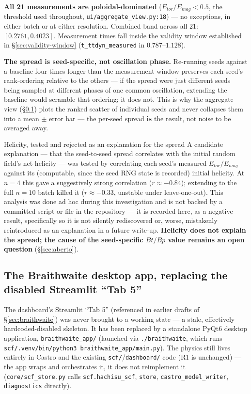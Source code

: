 \documentclass[11pt,a4paper]{scrartcl}
\newcommand{\code}[1]{\texttt{\small #1}}
\begin{document}
\textbf{All 21 measurements are poloidal-dominated}
($E_{tor}/E_{mag}<0.5$, the threshold used throughout,
\code{ui/aggregate\_view.py:18}) --- no exceptions, in either batch or
at either resolution. Combined band across all 21: $[0.2761,0.4023]$.
Measurement times fall inside the validity window established in
\S\ref{sec:validity-window} (\code{t\_ttdyn\_measured} in
$0.787$--$1.128$).

\textbf{The spread is seed-specific, not oscillation phase.}
Re-running seeds against a baseline four times longer than the
measurement window preserves each seed's rank-ordering relative to the
others --- if the spread were just different seeds being sampled at
different phases of one common oscillation, extending the baseline
would scramble that ordering; it does not. This is why the aggregate
view (\S\ref{sec:desktop-app}) plots the ranked scatter of individual
seeds and never collapses them into a mean $\pm$ error bar --- the
per-seed spread \textbf{is} the result, not noise to be averaged away.

\begin{notebox}{Helicity, tested and rejected as an explanation for the spread}
A candidate explanation --- that the seed-to-seed spread correlates
with the initial random field's net helicity --- was tested by
correlating each seed's measured $E_{tor}/E_{mag}$ against its
(computable, since the seed RNG state is recorded) initial helicity. At
$n=4$ this gave a suggestively strong correlation ($r\approx-0.84$);
extending to the full $n=10$ batch killed it ($r\approx-0.33$, unstable
under leave-one-out). This analysis was done ad hoc during this
investigation and is not backed by a committed script or file in the
repository --- it is recorded here, as a negative result, specifically
so it is not silently rediscovered or, worse, mistakenly reintroduced
as an explanation in a future write-up. \textbf{Helicity does not
explain the spread; the cause of the seed-specific $Bt/Bp$ value
remains an open question} (\S\ref{sec:aberto}).
\end{notebox}

\subsection{The Braithwaite desktop app, replacing the disabled Streamlit ``Tab 5''}
\label{sec:desktop-app}

The dashboard's Streamlit ``Tab 5'' (referenced in earlier drafts of
\S\ref{sec:braithwaite}) was never brought to a working state --- a
stale, effectively hardcoded-disabled skeleton. It has been replaced by
a standalone PyQt6 desktop application, \code{braithwaite\_app/}
(launched via \code{./braithwaite}, which runs
\code{scf/.venv/bin/python3 braithwaite\_app/main.py}). The physics
still lives entirely in Castro and the existing
\code{scf/}/\code{dashboard/} code (R1 is unchanged) --- the app wraps
and orchestrates it, it does not reimplement it
(\code{core/scf\_store.py} calls \code{scf.hachisu\_scf},
\code{store}, \code{castro\_model\_writer}, \code{diagnostics}
directly).
\end{document}
